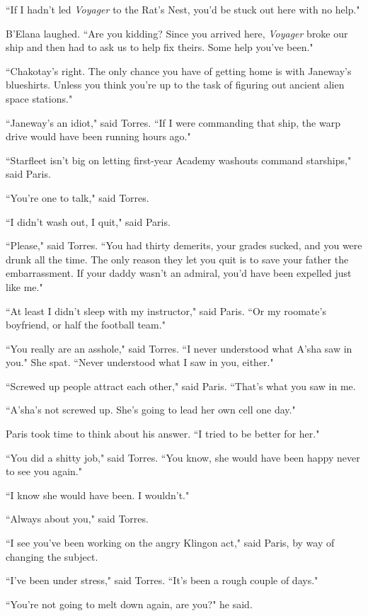 \documentclass[twoside,letterpaper,12pt]{memoir}
\begin{document}
``If I hadn't led \textit{Voyager} to the Rat's Nest, you'd be stuck out here with no help."

B'Elana laughed. ``Are you kidding? Since you arrived here, \textit{Voyager} broke our ship and then had to ask us to help fix theirs. Some help you've been."

``Chakotay's right. The only chance you have of getting home is with Janeway's blueshirts. Unless you think you're up to the task of figuring out ancient alien space stations."

``Janeway's an idiot," said Torres. ``If I were commanding that ship, the warp drive would have been running hours ago."

``Starfleet isn't big on letting first-year Academy washouts command starships," said Paris.

``You're one to talk," said Torres.

``I didn't wash out, I quit," said Paris.

``Please," said Torres. ``You had thirty demerits, your grades sucked, and you were drunk all the time. The only reason they let you quit is to save your father the embarrassment. If your daddy wasn't an admiral, you'd have been expelled just like me."

``At least I didn't sleep with my instructor," said Paris. ``Or my roomate’s boyfriend, or half the football team."

``You really are an asshole," said Torres. ``I never understood what A'sha saw in you." She spat. ``Never understood what I saw in you, either."

``Screwed up people attract each other," said Paris. ``That's what you saw in me.

``A'sha's not screwed up. She's going to lead her own cell one day."

Paris took time to think about his answer. ``I tried to be better for her."

``You did a shitty job," said Torres. ``You know, she would have been happy never to see you again."

``I know she would have been. I wouldn't."

``Always about you," said Torres.

``I see you've been working on the angry Klingon act," said Paris, by way of changing the subject.

``I've been under stress," said Torres. ``It's been a rough couple of days."

``You're not going to melt down again, are you?" he said.
\end{document}

